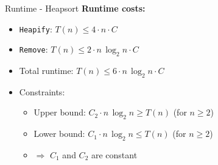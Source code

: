 \begin{frame}{Runtime - Heapsort}
  \textbf{Runtime costs:}
  \begin{itemize}
    \item
      \texttt{Heapify}: $T(n) \leq 4 \cdot n \cdot C$
    \item<2- |handout:1>
      \texttt{Remove}: $T(n) \leq 2 \cdot n \, \log_2 n \cdot C$
    \item<3- |handout:1>
      Total runtime: $T(n) \leq 6 \cdot n \, \log_2 n \cdot C$
    \item<4- |handout:1>
      Constraints:
      \begin{itemize}
        \item
          {\color{MainB}Upper bound}:
          $C_2 \cdot n \, \log_2 n \geq T(n)$ (for $n \geq 2$)
        \item
          {\color{MainB}Lower bound}:
          $C_1 \cdot n \, \log_2 n \leq T(n)$ (for $n \geq 2$)
        \item<5- |handout:1>
          $\Rightarrow$ $C_1$ and $C_2$ are constant
      \end{itemize}
  \end{itemize}
\end{frame}
